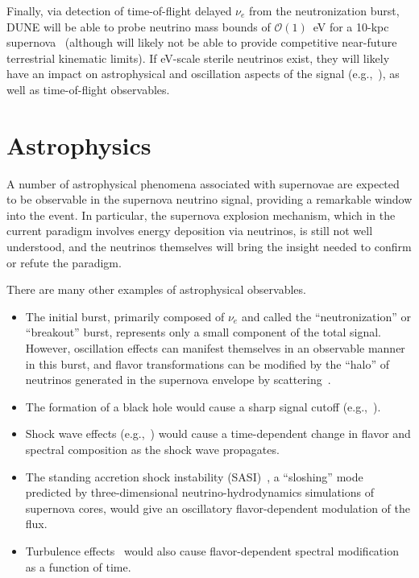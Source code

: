 Finally, via detection of time-of-flight delayed $\nu_e$ from the  neutronization burst,  DUNE will be able to probe neutrino mass bounds of $\mathcal{O}(1)$~eV for a 10-kpc supernova~\cite{Rossi-Torres:2015rla} (although will likely not be able to provide competitive near-future terrestrial kinematic limits).  If eV-scale sterile neutrinos exist, they will likely have an impact on astrophysical and oscillation aspects of the signal (e.g.,~\cite{Keranen:2007ga,Tamborra:2011is,Esmaili:2014gya}), as well as time-of-flight observables. \\


\section{Astrophysics}
\label{sec:physics-snblowe-astrophysics}


A number of astrophysical phenomena associated with supernovae are expected to be observable
in the supernova neutrino signal, providing a remarkable window into the event.  In particular, the supernova explosion mechanism, which in the current paradigm involves energy deposition via neutrinos, is still not well understood, and the neutrinos themselves will bring the insight needed to confirm or refute the paradigm.

There are many other examples of astrophysical observables.
\begin{itemize}
\item The initial burst, primarily composed of $\nu_e$ and called the
  ``neutronization'' or ``breakout''
  burst, 
  represents only a small component of the total signal. 
   However,
  oscillation effects can manifest themselves in an observable manner
  in this burst, and flavor transformations can be modified by the
  ``halo'' of neutrinos generated in the supernova envelope by
  scattering~\cite{Cherry:2013mv}.  
  
\item The formation of a black hole would cause a sharp signal cutoff
  (e.g.,~\cite{Beacom:2000qy,Fischer:2008rh}).
\item Shock wave effects (e.g.,~\cite{Schirato:2002tg}) would cause a
  time-dependent change in flavor and spectral composition as the
  shock wave propagates.
\item The standing accretion shock instability
  (SASI)~\cite{Hanke:2011jf,Hanke:2013ena}, a ``sloshing'' mode
  predicted by three-dimensional neutrino-hydrodynamics simulations of
  supernova cores, would give an oscillatory flavor-dependent
  modulation of the flux.
\item Turbulence effects~\cite{Friedland:2006ta,Lund:2013uta} would
  also cause flavor-dependent spectral modification as a function of
  time.
\end{itemize}

